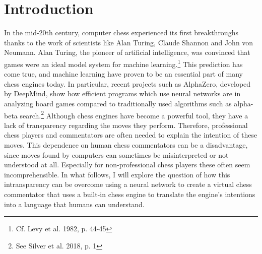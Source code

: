 \section{Introduction}

In the mid-20th century, computer chess experienced its first breakthroughs thanks to the work of scientists like Alan Turing, Claude Shannon and John von Neumann. Alan Turing, the pioneer of artificial intelligence, was convinced that games were an ideal model system for machine learning.\footnote{Cf. Levy et al. 1982, p. 44-45} This prediction has come true, and machine learning have proven to be an essential part of many chess engines today. In particular, recent projects such as AlphaZero, developed by DeepMind, show how efficient programs which use neural networks are in analyzing board games compared to traditionally used algorithms such as alpha-beta search.\footnote{See Silver et al. 2018, p. 1} Although chess engines have become a powerful tool, they have a lack of transparency regarding the moves they perform. Therefore, professional chess players and commentators are often needed to explain the intention of these moves. This dependence on human chess commentators can be a disadvantage, since moves found by computers can sometimes be misinterpreted or not understood at all. Especially for non-professional chess players these often seem incomprehensible. In what follows, I will explore the question of how this intransparency can be overcome using a neural network to create a virtual chess commentator that uses a built-in chess engine to translate the engine's intentions into a language that humans can understand.